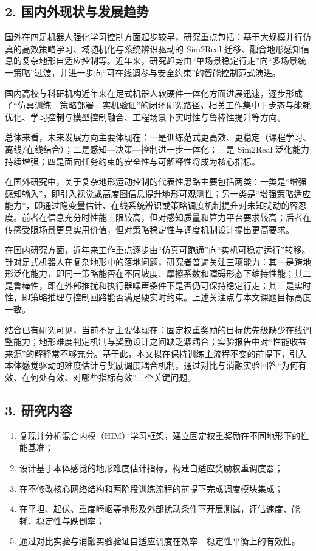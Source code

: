 \documentclass[12pt,a4paper]{ctexart}
\begin{document}
\subsection*{2. 国内外现状与发展趋势}
国外在四足机器人强化学习控制方面起步较早，研究重点包括：基于大规模并行仿真的高效策略学习、域随机化与系统辨识驱动的 Sim2Real 迁移、融合地形感知信息的复杂地形自适应控制等。近年来，研究趋势由“单场景稳定行走”向“多场景统一策略”过渡，并进一步向“可在线调参与安全约束”的智能控制范式演进。

国内高校与科研机构近年来在足式机器人软硬件一体化方面进展迅速，逐步形成了“仿真训练—策略部署—实机验证”的闭环研究路径。相关工作集中于步态与能耗优化、学习控制与模型控制融合、工程场景下实时性与鲁棒性提升等方向。

总体来看，未来发展方向主要体现在：一是训练范式更高效、更稳定（课程学习、离线/在线结合）；二是感知—决策—控制进一步一体化；三是 Sim2Real 泛化能力持续增强；四是面向任务约束的安全性与可解释性将成为核心指标。

在国外研究中，关于复杂地形运动控制的代表性思路主要包括两类：一类是“增强感知输入”，即引入视觉或高度图信息提升地形可观测性；另一类是“增强策略适应能力”，即通过隐变量估计、在线系统辨识或策略调度机制提升对未知扰动的容忍度。前者在信息充分时性能上限较高，但对感知质量和算力平台要求较高；后者在传感受限场景更具实用价值，但对策略稳定性与调度机制设计提出更高要求。

在国内研究方面，近年来工作重点逐步由“仿真可跑通”向“实机可稳定运行”转移。针对足式机器人在复杂地形中的落地问题，研究者普遍关注三项能力：其一是跨地形泛化能力，即同一策略能否在不同坡度、摩擦系数和障碍形态下维持性能；其二是鲁棒性，即在外部推扰和执行器噪声条件下是否仍可保持稳定行走；其三是实时性，即策略推理与控制回路能否满足硬实时约束。上述关注点与本文课题目标高度一致。

结合已有研究可见，当前不足主要体现在：固定权重奖励的目标优先级缺少在线调整能力；地形难度判定机制与奖励设计之间缺乏紧耦合；实验报告中对“性能收益来源”的解释常不够充分。基于此，本文拟在保持训练主流程不变的前提下，引入本体感觉驱动的难度估计与奖励调度耦合机制，通过对比与消融实验回答“为何有效、在何处有效、对哪些指标有效”三个关键问题。

\subsection*{3. 研究内容}
\begin{enumerate}
  \item 复现并分析混合内模（HIM）学习框架，建立固定权重奖励在不同地形下的性能基准；
  \item 设计基于本体感觉的地形难度估计指标，构建自适应奖励权重调度器；
  \item 在不修改核心网络结构和两阶段训练流程的前提下完成调度模块集成；
  \item 在平坦、起伏、重度崎岖等地形及外部扰动条件下开展测试，评估速度、能耗、稳定性与跌倒率；
  \item 通过对比实验与消融实验验证自适应调度在效率—稳定性平衡上的有效性。
\end{enumerate}
\end{document}
